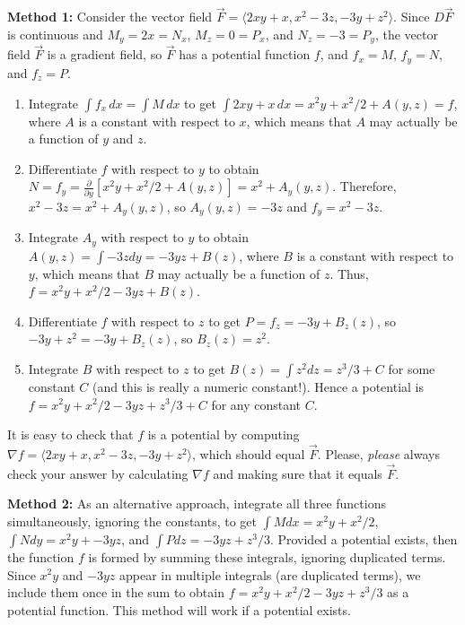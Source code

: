 \textbf{Method 1:} Consider the vector field $\vec
F=\langle2xy+x,x^2-3z,-3y+z^2\rangle$. Since $D\vec F$ is continuous and
$M_y=2x=N_x$, $M_z=0=P_x$, and $N_z=-3=P_y$, the vector field $\vec F$ is a
gradient field, so $\vec F$ has a potential function $f$, and $f_x=M$, $f_y=N$, and $f_z=P$.
\begin{enumerate}
\item Integrate $\int f_x\,dx=\int M\,dx$ to get $\int 2xy+x\,dx =
  x^2y+x^2/2+A(y,z)=f$, where $A$ is a constant with respect to $x$,
  which means that $A$ may actually be a function of $y$ and $z$.
\item Differentiate $f$ with respect to $y$ to obtain
  $N=f_y=\frac{\partial}{\partial y}[x^2y+x^2/2+A(y,z)] = x^2+A_y(y,z)$. Therefore,
  $x^2-3z=x^2+A_y(y,z)$, so $A_y(y,z)= -3z$ and $f_y=x^2-3z$.
\item Integrate $A_y$ with respect to $y$ to obtain $A(y,z)=\int -3z dy =
  -3yz+B(z)$, where $B$ is a constant with respect to $y$, which means
  that $B$ may actually be a function of $z$.  Thus,
  $f=x^2y+x^2/2-3yz+B(z)$.
\item Differentiate $f$ with respect to $z$ to get $P=f_z=-3y+B_z(z)$,
  so $-3y+z^2=-3y+B_z(z)$, so $B_z(z)=z^2$.
\item Integrate $B$ with respect to $z$ to get $B(z)=\int z^2 dz =
  z^3/3+C$ for some constant $C$ (and this is really a numeric
  constant!).  Hence a potential is $f= x^2y+x^2/2-3yz+z^3/3+C$ for
  any constant $C$.
\end{enumerate}

It is easy to check that $f$ is a potential by computing $\nabla f =
\langle2xy+x,x^2-3z,-3y+z^2\rangle$, which should equal $\vec F$.
Please, \emph{please} always check your answer by calculating $\nabla
f$ and making sure that it equals $\vec F$.

\textbf{Method 2:} As an alternative approach, integrate all three
functions simultaneously, ignoring the constants, to get $\int M dx =
x^2y+x^2/2$, $\int N dy = x^2y+-3yz$, and $\int P dz = -3yz +z^3/3$.
Provided a potential exists, then the function $f$ is formed by
summing these integrals, ignoring duplicated terms. Since $x^2y$ and
$-3yz$ appear in multiple integrals (are duplicated terms), we include
them once in the sum to obtain $f= x^2y+x^2/2-3yz+z^3/3$ as a
potential function. This method will work if a potential exists.

